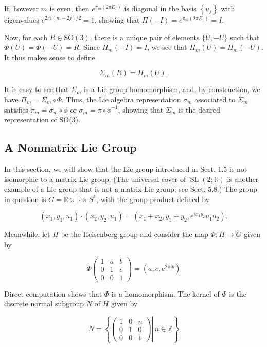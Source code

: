 \documentclass[10pt, letterpaper]{article}
\begin{document}
If, however $m$ is even, then $e^{\pi_{m}\left(2 \pi E_{1}\right)}$ is diagonal in the basis $\left\{u_{j}\right\}$ with eigenvalues $e^{2 \pi i(m-2 j) / 2}=1$, showing that $\Pi(-I)=e^{\pi_{m}\left(2 \pi E_{1}\right)}=I$.

Now, for each $R \in \mathrm{SO}(3)$, there is a unique pair of elements $\{U,-U\}$ such that $\Phi(U)=\Phi(-U)=R$. Since $\Pi_{m}(-I)=I$, we see that $\Pi_{m}(U)=\Pi_{m}(-U)$. It thus makes sense to define

$$
\Sigma_{m}(R)=\Pi_{m}(U) .
$$

It is easy to see that $\Sigma_{m}$ is a Lie group homomorphism, and, by construction, we have $\Pi_{m}=\Sigma_{m} \circ \Phi$. Thus, the Lie algebra representation $\sigma_{m}$ associated to $\Sigma_{m}$ satisfies $\pi_{m}=\sigma_{m} \circ \phi$ or $\sigma_{m}=\pi \circ \phi^{-1}$, showing that $\Sigma_{m}$ is the desired representation of SO(3).

\subsection*{A Nonmatrix Lie Group}
In this section, we will show that the Lie group introduced in Sect. 1.5 is not isomorphic to a matrix Lie group. (The universal cover of $\operatorname{SL}(2 ; \mathbb{R})$ is another example of a Lie group that is not a matrix Lie group; see Sect. 5.8.) The group in question is $G=\mathbb{R} \times \mathbb{R} \times S^{1}$, with the group product defined by

$$
\left(x_{1}, y_{1}, u_{1}\right) \cdot\left(x_{2}, y_{2}, u_{1}\right)=\left(x_{1}+x_{2}, y_{1}+y_{2}, e^{i x_{1} y_{2}} u_{1} u_{2}\right) .
$$

Meanwhile, let $H$ be the Heisenberg group and consider the map $\Phi: H \rightarrow G$ given by

$$
\Phi\left(\begin{array}{lll}
1 & a & b \\
0 & 1 & c \\
0 & 0 & 1
\end{array}\right)=\left(a, c, e^{2 \pi i b}\right)
$$

Direct computation shows that $\Phi$ is a homomorphism. The kernel of $\Phi$ is the discrete normal subgroup $N$ of $H$ given by

$$
N=\left\{\left.\left(\begin{array}{lll}
1 & 0 & n \\
0 & 1 & 0 \\
0 & 0 & 1
\end{array}\right) \right\rvert\, n \in \mathbb{Z}\right\}
$$
\end{document}
